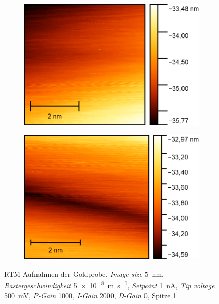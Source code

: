 \begin{figure}[H]
    \centering
    \begin{subfigure}{0.45\textwidth}
        \centering
        \includegraphics[width=\linewidth]{../figs/Gold10494}
        \caption{}
    \end{subfigure}
    \begin{subfigure}{0.45\textwidth}
        \centering
        \includegraphics[width=\linewidth]{../figs/Gold10495}
        \caption{}
    \end{subfigure}
    \caption{RTM-Aufnahmen der Goldprobe. \textit{Image size} \SI{5}{\nano \meter}, \textit{Rastergeschwindigkeit} \SI{5e-8}{\meter \per \second}, \textit{Setpoint} \SI{1}{\nano \ampere},
    \textit{Tip voltage} \SI{500}{\milli \volt}, \textit{P-Gain} \num{1000}, \textit{I-Gain} \num{2000}, \textit{D-Gain} \num{0}, Spitze 1}\label{fig:gold6}
\end{figure}